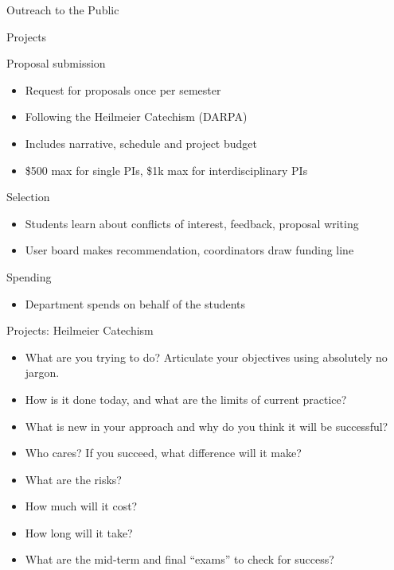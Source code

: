 \documentclass[xcolor=table,compress,professionalfonts,pdfpagelabels]{beamer}
\begin{document}
\begin{frame}{Outreach to the Public}
\end{frame}

\begin{frame}{Projects}
 \begin{block}{Proposal submission}
  \begin{itemize}
   \item Request for proposals once per semester
   \item Following the Heilmeier Catechism (DARPA)
   \item Includes narrative, schedule and project budget
   \item \$500 max for single PIs, \$1k max for interdisciplinary PIs
  \end{itemize}
 \end{block}
 \begin{block}{Selection}
  \begin{itemize}
   \item Students learn about conflicts of interest, feedback, proposal writing
   \item User board makes recommendation, coordinators draw funding line
  \end{itemize}
 \end{block}
 \begin{block}{Spending}
  \begin{itemize}
   \item Department spends on behalf of the students
  \end{itemize}
 \end{block}
\end{frame}

\begin{frame}{Projects: Heilmeier Catechism}
 \begin{itemize}
  \item What are you trying to do? Articulate your objectives using absolutely no jargon.
  \item How is it done today, and what are the limits of current practice?
  \item What is new in your approach and why do you think it will be successful?
  \item Who cares? If you succeed, what difference will it make?
  \item What are the risks?
  \item How much will it cost?
  \item How long will it take?
  \item What are the mid-term and final “exams” to check for success?
 \end{itemize}
\end{frame}
\end{document}
